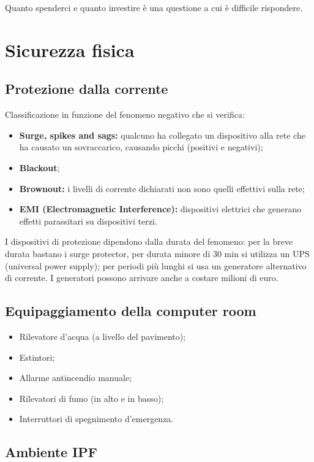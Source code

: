 Quanto spenderci e quanto investire è una questione a cui è difficile
rispondere.

\section{Sicurezza fisica}
\label{SFDP:fisica}
\subsection{Protezione dalla corrente}

Classificazione in funzione del fenomeno negativo che si verifica:
\begin{itemize}
\item \textbf{Surge, spikes and sags:} qualcuno ha collegato un dispositivo alla rete che
ha causato un sovraccarico, causando picchi (positivi e negativi);
\item \textbf{Blackout};
\item \textbf{Brownout:} i livelli di corrente dichiarati non sono quelli effettivi sulla
rete;
\item \textbf{EMI (Electromagnetic Interference):} dispositivi elettrici che generano
effetti parassitari su dispositivi terzi.
\end{itemize}

I dispositivi di protezione dipendono dalla durata del fenomeno: per la breve
durata bastano i surge protector, per durata minore di 30 min si utilizza un UPS
(universal power supply); per periodi più lunghi si usa un generatore
alternativo di corrente. I generatori possono arrivare anche a costare milioni
di euro.

\subsection{Equipaggiamento della computer room}

\begin{itemize}
\item Rilevatore d'acqua (a livello del pavimento);
\item Estintori;
\item Allarme antincendio manuale;
\item Rilevatori di fumo (in alto e in basso);
\item Interruttori di spegnimento d'emergenza.
\end{itemize}

\subsection{Ambiente IPF}

